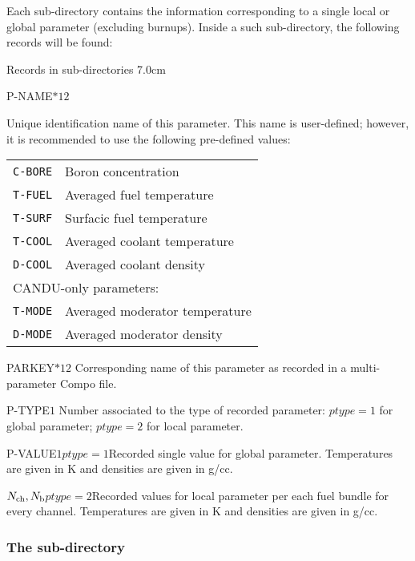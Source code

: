 Each  sub-directory contains the information corresponding
to a single local or global parameter (excluding  burnups). Inside a such sub-directory,
the following records will be found:

\begin{DescriptionEnregistrement}{Records in  sub-directories}
{7.0cm} \label{tabl:tabparam}

\CharEnr
 {P-NAME}{$*12$} {Unique identification name of this parameter. This
 name is user-defined; however, it is recommended to use the following pre-defined
 values:

\begin{tabular}{|c|l|}
\hline
{\tt C-BORE} & Boron concentration \\
{\tt T-FUEL} & Averaged fuel temperature \\
{\tt T-SURF} & Surfacic fuel temperature \\
{\tt T-COOL} & Averaged coolant temperature \\
{\tt D-COOL} & Averaged coolant density \\
\hline
\multicolumn{2}{|l|}{CANDU-only parameters:} \\
\hline
{\tt T-MODE} & Averaged moderator temperature\\
{\tt D-MODE} & Averaged moderator density \\
\hline
\end{tabular}
 }

\CharEnr
 {PARKEY}{$*12$} {Corresponding name of this parameter as recorded
  in a multi-parameter Compo file.}

\IntEnr
 {P-TYPE}{$1$} {Number associated to the type of recorded parameter:
 $ptype=1$ for global parameter; $ptype=2$ for local parameter.}

\OptRealEnr
 {P-VALUE}{$1$}{$ptype=1$}{}{Recorded single value for global parameter. Temperatures are given in K and densities are given in g/cc.}

\OptRealEnr
  {}{$N_{\rm ch}, N_{\rm b}$}{$ptype=2$}{}{Recorded values for local parameter per each fuel
  bundle for every channel. Temperatures are given in K and densities are given in g/cc.}

\end{DescriptionEnregistrement}

\subsubsection{The  sub-directory}\label{sect:dirrodinfo}

